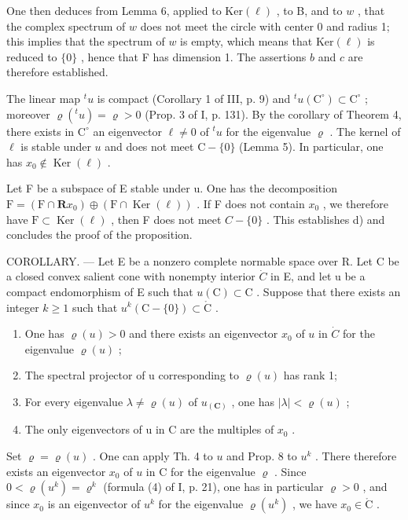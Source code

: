 One then deduces from Lemma 6, applied to \(\mathrm{Ker}(\ell)\) , to B, and to \(w\) , that the complex spectrum of \(w\) does not meet the circle with center 0 and radius 1; this implies that the spectrum of \(w\) is empty, which means that \(\mathrm{Ker}(\ell)\) is reduced to \(\{0\}\) , hence that F has dimension 1. The assertions \(b\) and \(c\) are therefore established.

The linear map \({}^t u\) is compact (Corollary 1 of III, p. 9) and \({}^t u(\mathrm{C}^\circ) \subset \mathrm{C}^\circ\) ; moreover \(\varrho(^t u) = \varrho > 0\) (Prop. 3 of I, p. 131). By the corollary of Theorem 4, there exists in \(\mathrm{C}^\circ\) an eigenvector \(\ell \neq 0\) of \({}^t u\) for the eigenvalue \(\varrho\) . The kernel of \(\ell\) is stable under \(u\) and does not meet \(\mathrm{C} - \{0\}\) (Lemma 5). In particular, one has \(x_0 \notin \operatorname{Ker}(\ell)\) .

Let F be a subspace of E stable under u. One has the decomposition \(\mathrm{F} = (\mathrm{F} \cap \mathbf{R}x_{0}) \oplus (\mathrm{F} \cap \operatorname{Ker}(\ell))\) . If F does not contain \(x_{0}\) , we therefore have \(\mathrm{F} \subset \operatorname{Ker}(\ell)\) , then F does not meet \(C - \{0\}\) . This establishes d) and concludes the proof of the proposition.

COROLLARY. --- Let E be a nonzero complete normable space over R. Let C be a closed convex salient cone with nonempty interior \(\dot{C}\) in E, and let u be a compact endomorphism of E such that \(u(\mathrm{C}) \subset \mathrm{C}\) . Suppose that there exists an integer \(k \geqslant 1\) such that \(u^{k}(\mathrm{C} - \{0\}) \subset \mathring{\mathrm{C}}\) .

\begin{enumerate}
\def\labelenumi{\alph{enumi})}
\item
  One has \(\varrho(u) > 0\) and there exists an eigenvector \(x_0\) of \(u\) in \(\dot{C}\) for the eigenvalue \(\varrho(u)\) ;
\item
  The spectral projector of u corresponding to \(\varrho(u)\) has rank 1;
\item
  For every eigenvalue \(\lambda \neq \varrho(u)\) of \(u_{(\mathbf{C})}\) , one has \(|\lambda| < \varrho(u)\) ;
\item
  The only eigenvectors of u in C are the multiples of \(x_0\) .
\end{enumerate}

Set \(\varrho = \varrho(u)\) . One can apply Th. 4 to \(u\) and Prop. 8 to \(u^k\) . There therefore exists an eigenvector \(x_0\) of \(u\) in C for the eigenvalue \(\varrho\) . Since \(0 < \varrho(u^k) = \varrho^k\) (formula (4) of I, p. 21), one has in particular \(\varrho > 0\) , and since \(x_0\) is an eigenvector of \(u^k\) for the eigenvalue \(\varrho(u^k)\) , we have \(x_0 \in \mathring{\mathrm{C}}\) .

